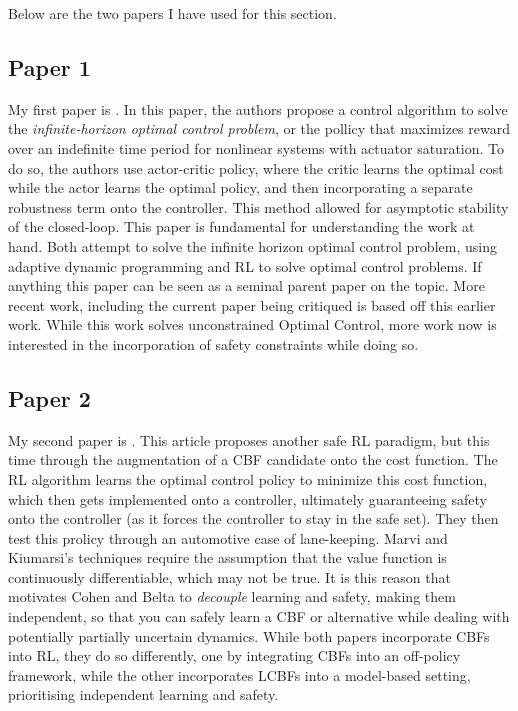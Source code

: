 \documentclass[10pt, oneside]{article}
\newenvironment{problem}[2][Problem]{\begin{trivlist}
    \item[\hskip \labelsep {\bfseries #1}\hskip \labelsep {\bfseries #2.}]}{\end{trivlist}}
\begin{document}
    
\begin{problem}{$\#4$}
Below are the two papers I have used for this section.
\subsection{Paper 1}
My first paper is \cite{7302057}. In this paper, the authors propose a control algorithm to solve the \textit{infinite-horizon optimal control problem}, or the pollicy that maximizes reward over an indefinite time period for nonlinear systems with actuator saturation. To do so, the authors use actor-critic policy, where the critic learns the optimal cost while the actor learns the optimal policy, and then incorporating a separate robustness term onto the controller. This method allowed for asymptotic stability of the closed-loop. 
This paper is fundamental for understanding the work at hand. Both attempt to solve the infinite horizon optimal control problem, using adaptive dynamic programming and RL to solve optimal control problems. If anything this paper can be seen as a seminal parent paper on the topic. More recent work, including the current paper being critiqued is based off this earlier work. While this work solves unconstrained Optimal Control, more work now is interested in the incorporation of safety constraints while doing so. 
\subsection{Paper 2}
My second paper is \cite{marvi2021safe}. This article proposes another safe RL paradigm, but this time through the augmentation of a CBF candidate onto the cost function. The RL algorithm learns the optimal control policy to minimize this cost function, which then gets implemented onto a controller, ultimately guaranteeing safety onto the controller (as it forces the controller to stay in the safe set). They then test this prolicy through an automotive case of lane-keeping. 
Marvi and Kiumarsi's techniques require the assumption that the value function is continuously differentiable, which may not be true. It is this reason that motivates Cohen and Belta to \textit{decouple} learning and safety, making them independent, so that you can safely learn a CBF or alternative while dealing with potentially partially uncertain dynamics. While both papers incorporate CBFs into RL, they do so differently, one by integrating CBFs into an off-policy framework, while the other incorporates LCBFs into a model-based setting, prioritising independent learning and safety. 


\end{problem}
\end{document}
